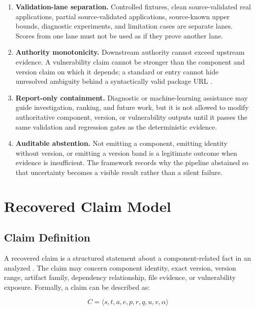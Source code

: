\begin{enumerate}[label=\textbf{P\arabic*.},leftmargin=2.2cm]
  \item \textbf{Validation-lane separation.}
  Controlled fixtures, clean source-validated real applications, partial
  source-validated applications, source-known upper bounds, diagnostic
  experiments, and limitation cases are separate lanes. Scores from one lane
  must not be used as if they prove another lane.

  \item \textbf{Authority monotonicity.}
  Downstream authority cannot exceed upstream evidence. A vulnerability claim
  cannot be stronger than the component and version claim on which it depends;
  a standard \CycloneDX or \SPDX entry cannot hide unresolved ambiguity behind
  a syntactically valid package URL \cite{spdxSpecification,cyclonedxSpecification,packageUrlSpecification}.

  \item \textbf{Report-only containment.}
  Diagnostic or machine-learning assistance may guide investigation, ranking,
  and future work, but it is not allowed to modify authoritative component,
  version, or vulnerability outputs until it passes the same validation and
  regression gates as the deterministic evidence.

  \item \textbf{Auditable abstention.}
  Not emitting a component, emitting identity without version, or emitting a
  version band is a legitimate outcome when evidence is insufficient. The
  framework records why the pipeline abstained so that uncertainty becomes a
  visible result rather than a silent failure.
\end{enumerate}

\section{Recovered Claim Model}

\subsection{Claim Definition}

A recovered claim is a structured statement about a component-related fact in
an analyzed \APK. The claim may concern component identity, exact version,
version range, artifact family, dependency relationship, file evidence, or
vulnerability exposure. Formally, a claim can be described as:

\[
  C = \langle s, t, a, e, p, r, q, u, v, \alpha \rangle
\]

